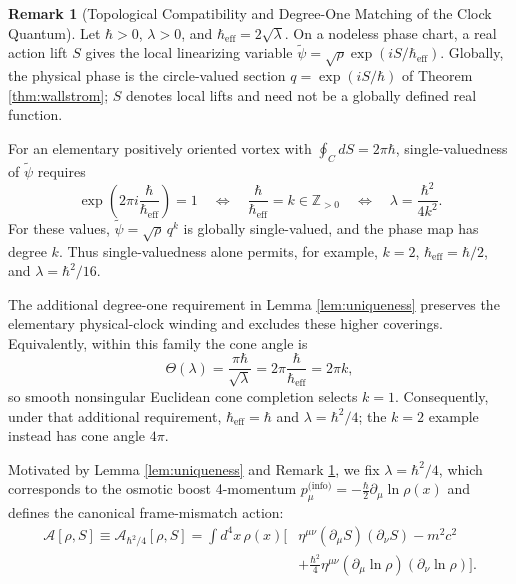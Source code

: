 \documentclass[11pt, a4paper]{article}
\theoremstyle{definition}
\newtheorem{remark}[theorem]{Remark}
\begin{document}
\begin{remark}[Topological Compatibility and Degree-One Matching of the Clock Quantum]
\label{rem:topological_hbar_lock}
Let $\hbar>0$, $\lambda>0$, and $\hbar_{\text{eff}}=2\sqrt{\lambda}$. On a nodeless phase chart, a real action lift $S$ gives the local linearizing variable $\tilde\psi=\sqrt{\rho}\exp(iS/\hbar_{\text{eff}})$. Globally, the physical phase is the circle-valued section $q=\exp(iS/\hbar)$ of Theorem \ref{thm:wallstrom}; $S$ denotes local lifts and need not be a globally defined real function.

For an elementary positively oriented vortex with $\oint_C dS=2\pi\hbar$, single-valuedness of $\tilde\psi$ requires
\[
\exp\!\left(2\pi i\frac{\hbar}{\hbar_{\text{eff}}}\right)=1
\quad\Longleftrightarrow\quad
\frac{\hbar}{\hbar_{\text{eff}}}=k\in\mathbb{Z}_{>0}
\quad\Longleftrightarrow\quad
\lambda=\frac{\hbar^2}{4k^2}.
\]
For these values, $\tilde\psi=\sqrt{\rho}\,q^k$ is globally single-valued, and the phase map has degree $k$. Thus single-valuedness alone permits, for example, $k=2$, $\hbar_{\text{eff}}=\hbar/2$, and $\lambda=\hbar^2/16$.

The additional degree-one requirement in Lemma \ref{lem:uniqueness} preserves the elementary physical-clock winding and excludes these higher coverings. Equivalently, within this family the cone angle is
\[
\Theta(\lambda)=\frac{\pi\hbar}{\sqrt{\lambda}}
=2\pi\frac{\hbar}{\hbar_{\text{eff}}}=2\pi k,
\]
so smooth nonsingular Euclidean cone completion selects $k=1$. Consequently, under that additional requirement, $\hbar_{\text{eff}}=\hbar$ and $\lambda=\hbar^2/4$; the $k=2$ example instead has cone angle $4\pi$.
\end{remark}

Motivated by Lemma \ref{lem:uniqueness} and Remark \ref{rem:topological_hbar_lock}, we fix $\lambda = \hbar^2/4$, which corresponds to the osmotic boost 4-momentum $p_\mu^{\text{(info)}} = -\frac{\hbar}{2}\partial_\mu \ln\rho(x)$ and defines the canonical frame-mismatch action:
\begin{equation}
\label{eq:coupled_action}
\begin{aligned}
\mathcal{A}[\rho, S] \equiv \mathcal{A}_{\hbar^2/4}[\rho, S] = \int d^4x \, \rho(x) \bigg[ &\eta^{\mu\nu} (\partial_\mu S)(\partial_\nu S) - m^2 c^2 \\
&+ \frac{\hbar^2}{4} \eta^{\mu\nu} (\partial_\mu \ln \rho)(\partial_\nu \ln \rho) \bigg].
\end{aligned}
\end{equation}
\end{document}

